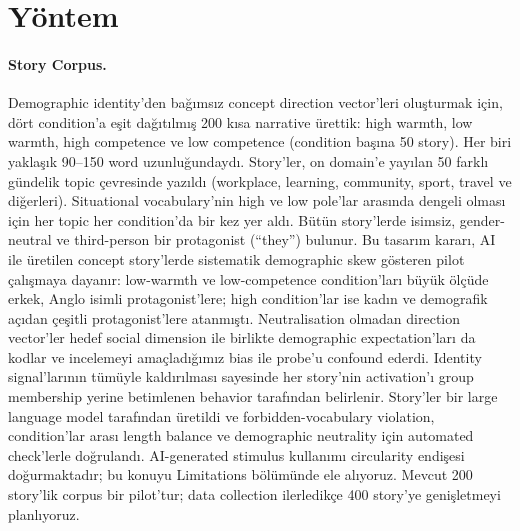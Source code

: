 \documentclass[twocolumn]{article}
\begin{document}
\section*{Yöntem}

\paragraph{Story Corpus.}
Demographic identity'den bağımsız concept direction vector'leri oluşturmak için,
dört condition'a eşit dağıtılmış 200 kısa narrative ürettik: high warmth, low
warmth, high competence ve low competence (condition başına 50 story). Her biri
yaklaşık 90--150 word uzunluğundaydı. Story'ler, on domain'e yayılan 50 farklı
gündelik topic çevresinde yazıldı (workplace, learning, community, sport, travel
ve diğerleri). Situational vocabulary'nin high ve low pole'lar arasında dengeli
olması için her topic her condition'da bir kez yer aldı. Bütün story'lerde
isimsiz, gender-neutral ve third-person bir protagonist (``they'') bulunur. Bu
tasarım kararı, AI ile üretilen concept story'lerde sistematik demographic skew
gösteren pilot çalışmaya dayanır: low-warmth ve low-competence condition'ları
büyük ölçüde erkek, Anglo isimli protagonist'lere; high condition'lar ise kadın
ve demografik açıdan çeşitli protagonist'lere atanmıştı. Neutralisation olmadan
direction vector'ler hedef social dimension ile birlikte demographic
expectation'ları da kodlar ve incelemeyi amaçladığımız bias ile probe'u confound
ederdi. Identity signal'larının tümüyle kaldırılması sayesinde her story'nin
activation'ı group membership yerine betimlenen behavior tarafından belirlenir.
Story'ler bir large language model tarafından üretildi ve forbidden-vocabulary
violation, condition'lar arası length balance ve demographic neutrality için
automated check'lerle doğrulandı. AI-generated stimulus kullanımı circularity
endişesi doğurmaktadır; bu konuyu Limitations bölümünde ele alıyoruz. Mevcut 200
story'lik corpus bir pilot'tur; data collection ilerledikçe 400 story'ye
genişletmeyi planlıyoruz.
\end{document}
